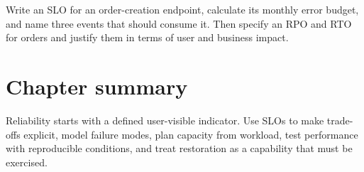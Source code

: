 \begin{exercise}
Write an SLO for an order-creation endpoint, calculate its monthly error budget,
and name three events that should consume it. Then specify an RPO and RTO for
orders and justify them in terms of user and business impact.
\end{exercise}

\section{Chapter summary}
Reliability starts with a defined user-visible indicator. Use SLOs to make trade-
offs explicit, model failure modes, plan capacity from workload, test performance
with reproducible conditions, and treat restoration as a capability that must be
exercised.

